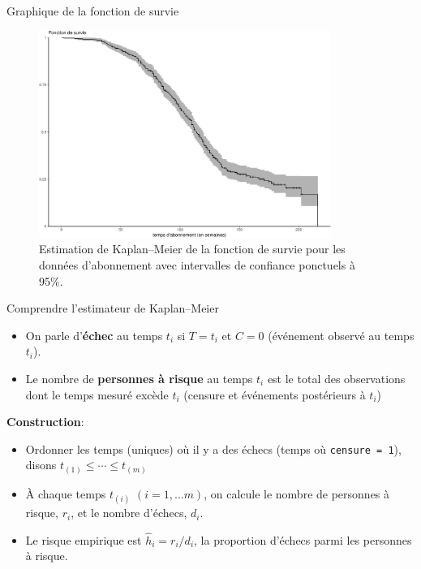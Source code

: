 \documentclass[
  ignorenonframetext,
]{beamer}
\providecommand{\tightlist}{%
  \setlength{\itemsep}{0pt}\setlength{\parskip}{0pt}}\usepackage{longtable,booktabs,array}
\begin{document}
\begin{frame}{Graphique de la fonction de survie}
\protect\hypertarget{graphique-de-la-fonction-de-survie}{}
\begin{figure}

{\centering \includegraphics[width=0.85\textwidth,height=\textheight]{MATH60602-diapos9_files/figure-beamer/fig-km-survie1-1.pdf}

}

\caption{\label{fig-km-survie1}Estimation de Kaplan--Meier de la
fonction de survie pour les données d'abonnement avec intervalles de
confiance ponctuels à 95\%.}

\end{figure}
\end{frame}

\begin{frame}[fragile]{Comprendre l'estimateur de Kaplan--Meier}
\protect\hypertarget{comprendre-lestimateur-de-kaplanmeier}{}
\begin{itemize}
\tightlist
\item
  On parle d'\textbf{échec} au temps \(t_i\) si \(T = t_i\) et \(C=0\)
  (événement observé au temps \(t_i\)).
\item
  Le nombre de \textbf{personnes à risque} au temps \(t_i\) est le total
  des observations dont le temps mesuré excède \(t_i\) (censure et
  événements postérieurs à \(t_i\))
\end{itemize}

\textbf{Construction}:

\begin{itemize}
\tightlist
\item
  Ordonner les temps (uniques) où il y a des échecs (temps où
  \texttt{censure\ =\ 1}), disons \(t_{(1)} \leq \cdots \leq t_{(m)}\)
\item
  À chaque temps \(t_{(i)}\) \((i=1, \ldots m)\), on calcule le nombre
  de personnes à risque, \(r_i\), et le nombre d'échecs, \(d_i\).
\item
  Le risque empirique est \(\widehat{h}_i = r_i/d_i\), la proportion
  d'échecs parmi les personnes à risque.
\end{itemize}
\end{frame}
\end{document}
